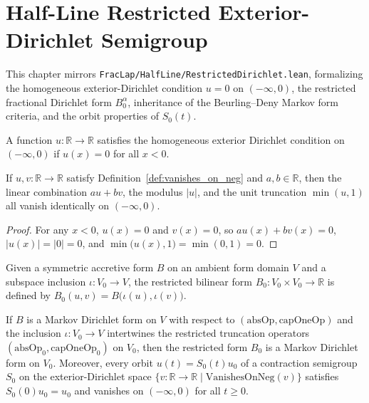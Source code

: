 \chapter{Half-Line Restricted Exterior-Dirichlet Semigroup}

This chapter mirrors \texttt{FracLap/HalfLine/RestrictedDirichlet.lean}, formalizing the homogeneous exterior-Dirichlet condition $u = 0$ on $(-\infty, 0)$, the restricted fractional Dirichlet form $B^\alpha_0$, inheritance of the Beurling--Deny Markov form criteria, and the orbit properties of $S_0(t)$.

\begin{definition}\label{def:vanishes_on_neg}
\leanok
A function $u : \mathbb{R} \to \mathbb{R}$ satisfies the homogeneous exterior Dirichlet condition on $(-\infty, 0)$ if $u(x) = 0$ for all $x < 0$.
\end{definition}

\begin{lemma}\label{lem:vanishes_on_neg_subspace}
\leanok
If $u, v : \mathbb{R} \to \mathbb{R}$ satisfy Definition~\ref{def:vanishes_on_neg} and $a, b \in \mathbb{R}$, then the linear combination $a u + b v$, the modulus $\lvert u \rvert$, and the unit truncation $\min(u, 1)$ all vanish identically on $(-\infty, 0)$.
\end{lemma}

\begin{proof}
\leanok
For any $x < 0$, $u(x) = 0$ and $v(x) = 0$, so $a u(x) + b v(x) = 0$, $\lvert u(x) \rvert = \lvert 0 \rvert = 0$, and $\min\bigl(u(x), 1\bigr) = \min(0, 1) = 0$.
\end{proof}

\begin{definition}\label{def:restrict_symmetric_accretive_form}
\leanok
Given a symmetric accretive form $B$ on an ambient form domain $V$ and a subspace inclusion $\iota : V_0 \to V$, the restricted bilinear form $B_0 : V_0 \times V_0 \to \mathbb{R}$ is defined by $B_0(u, v) = B\bigl(\iota(u), \iota(v)\bigr)$.
\end{definition}

\begin{theorem}\label{thm:restricted_form_markov}
\leanok
If $B$ is a Markov Dirichlet form on $V$ with respect to $(\mathrm{absOp}, \mathrm{capOneOp})$ and the inclusion $\iota : V_0 \to V$ intertwines the restricted truncation operators $(\mathrm{absOp}_0, \mathrm{capOneOp}_0)$ on $V_0$, then the restricted form $B_0$ is a Markov Dirichlet form on $V_0$. Moreover, every orbit $u(t) = S_0(t) u_0$ of a contraction semigroup $S_0$ on the exterior-Dirichlet space $\{v : \mathbb{R} \to \mathbb{R} \mid \mathrm{VanishesOnNeg}(v)\}$ satisfies $S_0(0) u_0 = u_0$ and vanishes on $(-\infty, 0)$ for all $t \ge 0$.
\end{theorem}

